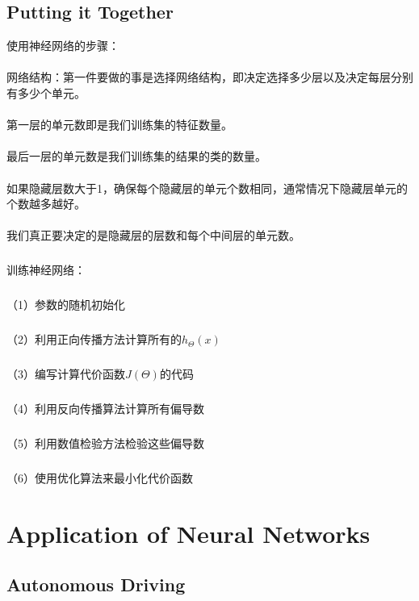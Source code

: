 \documentclass{article}
\begin{document}
\begin{CJK}{UTF8}{gbsn}
\subsection{Putting it Together}
使用神经网络的步骤：
\paragraph{}
网络结构：第一件要做的事是选择网络结构，即决定选择多少层以及决定每层分别有多少个单元。
\paragraph{}
第一层的单元数即是我们训练集的特征数量。
\paragraph{}
最后一层的单元数是我们训练集的结果的类的数量。
\paragraph{}
如果隐藏层数大于1，确保每个隐藏层的单元个数相同，通常情况下隐藏层单元的个数越多越好。
\paragraph{}
我们真正要决定的是隐藏层的层数和每个中间层的单元数。
\subparagraph{}
训练神经网络：
\subparagraph{}
（1）参数的随机初始化
\subparagraph{}
（2）利用正向传播方法计算所有的$h_\Theta(x)$
\subparagraph{}
（3）编写计算代价函数$J(\Theta)$的代码
\subparagraph{}
（4）利用反向传播算法计算所有偏导数
\subparagraph{}
（5）利用数值检验方法检验这些偏导数
\subparagraph{}
（6）使用优化算法来最小化代价函数
\section{Application of Neural Networks}
\subsection{Autonomous Driving}
\end{CJK}
\end{document}

